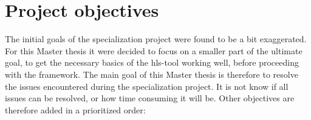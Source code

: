 \section{\label{sec:projectobj}Project objectives}
The initial goals of the specialization project were found to be a bit exaggerated. For this Master thesis it were decided to focus on a smaller part of the ultimate goal, to get the necessary basics of the \gls{hls}-tool working well, before proceeding with the framework. The main goal of this Master thesis is therefore to resolve the issues encountered during the specialization project. It is not know if all issues can be resolved, or how time consuming it will be. Other objectives are therefore added in a prioritized order:

\newcommand\litem[1]{\item{\bfseries #1\\}}
